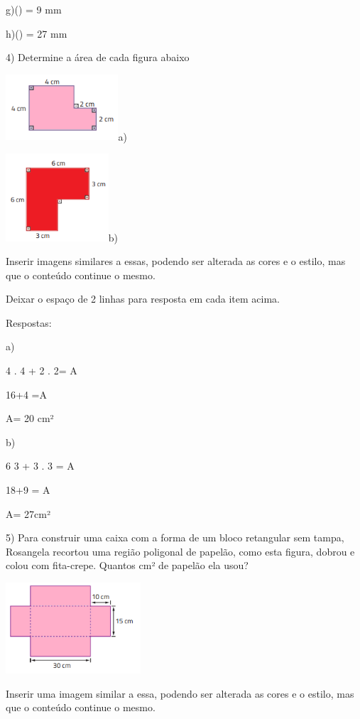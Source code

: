 g)() = 9 mm

h)() = 27 mm

4) Determine a área de cada figura abaixo

\includegraphics[width=1.65in,height=0.96458in]{./imgSAEB_8_MAT/media/image43.png}a)

\includegraphics[width=1.50833in,height=1.28681in]{./imgSAEB_8_MAT/media/image44.png}b)

Inserir imagens similares a essas, podendo ser alterada as cores e o
estilo, mas que o conteúdo continue o mesmo.

Deixar o espaço de 2 linhas para resposta em cada item acima.

Respostas:

a)

4 . 4 + 2 . 2= A

16+4 =A

A= 20 cm²

b)

\num{6} 3 + 3 . 3 = A

18+9 = A

A= 27cm²

5) Para construir uma caixa com a forma de um bloco retangular sem
tampa, Rosangela recortou uma região poligonal de papelão, como esta
figura, dobrou e colou com fita-crepe. Quantos cm² de papelão ela usou?

\includegraphics[width=1.98333in,height=1.33255in]{./imgSAEB_8_MAT/media/image45.png}

Inserir uma imagem similar a essa, podendo ser alterada as cores e o
estilo, mas que o conteúdo continue o mesmo.

